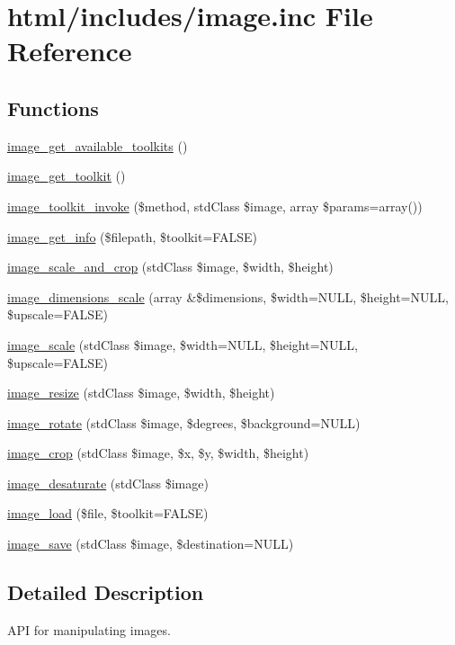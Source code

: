 \hypertarget{image_8inc}{
\section{html/includes/image.inc File Reference}
\label{image_8inc}
}
\subsection*{Functions}
\begin{DoxyCompactItemize}
\item 
\hyperlink{group__image_ga190b9b90f931916a5766ed11c29b9326}{image\_\-get\_\-available\_\-toolkits} ()
\item 
\hyperlink{group__image_ga08b3ce83f3526f248c1e08b4ee249a3a}{image\_\-get\_\-toolkit} ()
\item 
\hyperlink{group__image_ga49dd01a9f7b8037f15b99e098f068cb7}{image\_\-toolkit\_\-invoke} (\$method, stdClass \$image, array \$params=array())
\item 
\hyperlink{group__image_ga7b2603b2b9d073cc4db9a6200aa9c2a4}{image\_\-get\_\-info} (\$filepath, \$toolkit=FALSE)
\item 
\hyperlink{group__image_ga8d6850eecb498cf1683808eb66b74465}{image\_\-scale\_\-and\_\-crop} (stdClass \$image, \$width, \$height)
\item 
\hyperlink{group__image_gaf85b92c29d7c70328ccc3401357eaee9}{image\_\-dimensions\_\-scale} (array \&\$dimensions, \$width=NULL, \$height=NULL, \$upscale=FALSE)
\item 
\hyperlink{group__image_ga2eac147bb70d14d9439d6b0d54023ce3}{image\_\-scale} (stdClass \$image, \$width=NULL, \$height=NULL, \$upscale=FALSE)
\item 
\hyperlink{group__image_ga991594ed9388b740bc98a162b6bbc449}{image\_\-resize} (stdClass \$image, \$width, \$height)
\item 
\hyperlink{group__image_gaccf6671cd3ed866c6463ef6ae6436dc3}{image\_\-rotate} (stdClass \$image, \$degrees, \$background=NULL)
\item 
\hyperlink{group__image_gaaf7d382a8ec190f746478848ed309fe7}{image\_\-crop} (stdClass \$image, \$x, \$y, \$width, \$height)
\item 
\hyperlink{group__image_gadfcfdfcf1521b26ec790fc017c151aff}{image\_\-desaturate} (stdClass \$image)
\item 
\hyperlink{group__image_ga96098e5b039dc3906a656fa889a04776}{image\_\-load} (\$file, \$toolkit=FALSE)
\item 
\hyperlink{group__image_ga134df2e4d035378b52e866618c164f3b}{image\_\-save} (stdClass \$image, \$destination=NULL)
\end{DoxyCompactItemize}


\subsection{Detailed Description}
API for manipulating images. 